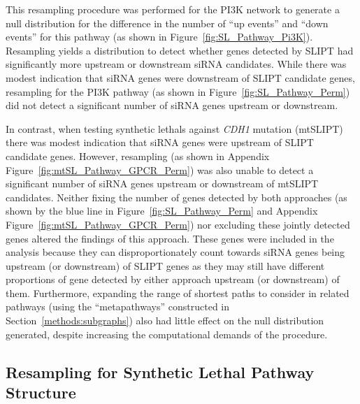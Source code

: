 This resampling procedure was performed for the \gls{PI3K} network to generate a null distribution for the difference in the number of ``up events'' and ``down events'' for this \gls{pathway} (as shown in Figure~\ref{fig:SL_Pathway_Pi3K}). Resampling yields a distribution to detect whether genes detected by \gls{SLIPT} had significantly more upstream or downstream \gls{siRNA} candidates. While there was modest indication that \gls{siRNA} genes were downstream of \gls{SLIPT} candidate genes, resampling for the \gls{PI3K} \gls{pathway} (as shown in Figure~\ref{fig:SL_Pathway_Perm}) did not detect a significant number of \gls{siRNA} genes upstream or downstream.

In contrast, when testing \glspl{synthetic lethal} against \textit{CDH1} \gls{mutation} (\acrshort{mtSLIPT}) there was modest indication that \gls{siRNA} genes were upstream of \gls{SLIPT} candidate genes. However, resampling (as shown in Appendix Figure~\ref{fig:mtSL_Pathway_GPCR_Perm}) was also unable to detect a significant number of \gls{siRNA} genes upstream or downstream of \acrshort{mtSLIPT} candidates. Neither fixing the number of genes detected by both approaches (as shown by the blue line in Figure~\ref{fig:SL_Pathway_Perm} and Appendix Figure~\ref{fig:mtSL_Pathway_GPCR_Perm}) nor excluding these jointly detected genes altered the findings of this approach. These genes were included in the analysis because they can disproportionately count towards \gls{siRNA} genes being upstream (or downstream) of \gls{SLIPT} genes as they may still have different proportions of gene detected by either approach upstream (or downstream) of them. Furthermore, expanding the range of \glspl{shortest path} to consider  in related \glspl{pathway} (using the ``metapathways'' constructed in Section~\ref{methods:subgraphs}) also had little effect on the null distribution generated, despite increasing the computational demands of the procedure.


\FloatBarrier

\subsection{Resampling for Synthetic Lethal Pathway Structure}  \label{chapt4:Structure_Perm}


